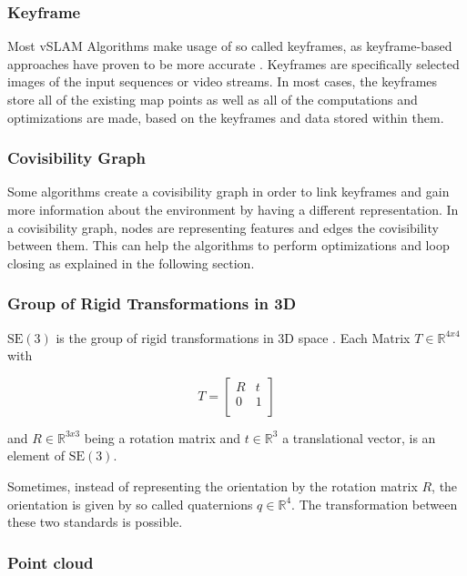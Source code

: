 		\subsubsection{Keyframe}
		
		Most vSLAM Algorithms make usage of so called keyframes, as  keyframe-based approaches have proven to be more accurate \cite{keyframe}.
		Keyframes are specifically selected images of the input sequences or video streams. In most cases, the keyframes store all of the existing 
		map points as well as all of the computations and optimizations are made, based on the keyframes and data stored within them. 
	
		\subsubsection{Covisibility Graph}
		
		Some algorithms create a covisibility graph in order to link keyframes and gain more information about the environment by having a different representation. 
		In a covisibility graph, nodes are representing features and edges the covisibility between them. 
		This can help the algorithms to perform optimizations and loop closing as explained in the following section.
		
		\subsubsection{Group of Rigid Transformations in 3D}\label{pose}
		
		$\text{SE}(3)$ is the group of rigid transformations in 3D space \cite{se3}. Each Matrix $ T \in \mathbb{R}^{4x4}$ with 
		
		$$ T = \left[
		\begin{array}{rrr}
		R &  t \\  
		0  & 1 \\ 
		\end{array} \right]$$
		
		and $ R \in \mathbb{R}^{3x3}$ being a rotation matrix and $ t \in \mathbb{R}^{3}$ a translational vector, is an element of $\text{SE}(3)$.
		
		Sometimes, instead of representing the orientation by the rotation matrix $R$, the orientation is given by so called quaternions $q \in \mathbb{R}^4$. 
		The transformation between these two standards is possible. 
		
		\subsubsection{Point cloud}
		
